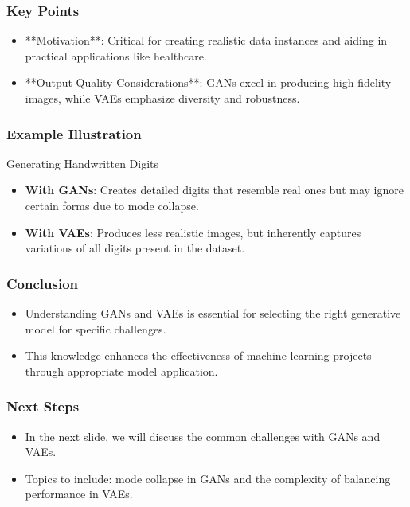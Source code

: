 \documentclass[aspectratio=169]{beamer}
\begin{document}
\begin{frame}[fragile]
    \frametitle{Key Points}
    \begin{itemize}
        \item **Motivation**: Critical for creating realistic data instances and aiding in practical applications like healthcare.
        \item **Output Quality Considerations**: GANs excel in producing high-fidelity images, while VAEs emphasize diversity and robustness.
    \end{itemize}
\end{frame}

\begin{frame}[fragile]
    \frametitle{Example Illustration}
    \begin{block}{Generating Handwritten Digits}
        \begin{itemize}
            \item \textbf{With GANs}: Creates detailed digits that resemble real ones but may ignore certain forms due to mode collapse.
            \item \textbf{With VAEs}: Produces less realistic images, but inherently captures variations of all digits present in the dataset.
        \end{itemize}
    \end{block}
\end{frame}

\begin{frame}[fragile]
    \frametitle{Conclusion}
    \begin{itemize}
        \item Understanding GANs and VAEs is essential for selecting the right generative model for specific challenges.
        \item This knowledge enhances the effectiveness of machine learning projects through appropriate model application.
    \end{itemize}
\end{frame}

\begin{frame}[fragile]
    \frametitle{Next Steps}
    \begin{itemize}
        \item In the next slide, we will discuss the common challenges with GANs and VAEs.
        \item Topics to include: mode collapse in GANs and the complexity of balancing performance in VAEs.
    \end{itemize}
\end{frame}
\end{document}
